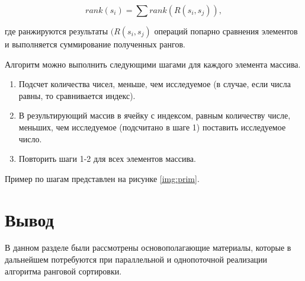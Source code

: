  \begin{equation}
 	\label{for:selection_best}
 	rank(s_{i}) = \sum rank(R(s_{i}, s_{j})),
 \end{equation}

где ранжируются результаты $(R(s_{i}, s_{j})$ операций попарно сравнения элементов и выполняется суммирование полученных рангов.

Алгоритм можно выполнить следующими шагами для каждого элемента массива.
\begin{enumerate}
	\item Подсчет количества чисел, меньше, чем исследуемое (в случае, если числа равны, то сравнивается индекс).
	\item В результирующий массив в ячейку с индексом, равным количеству числе, меньших, чем исследуемое (подсчитано в шаге 1) поставить исследуемое число.
	\item Повторить шаги 1-2 для всех элементов массива.
\end{enumerate}

Пример по шагам представлен на рисунке \ref{img:prim}.

\clearpage


\section*{Вывод}
В данном разделе были рассмотрены основополагающие материалы, которые в дальнейшем потребуются при параллельной и однопоточной реализации алгоритма ранговой сортировки.

